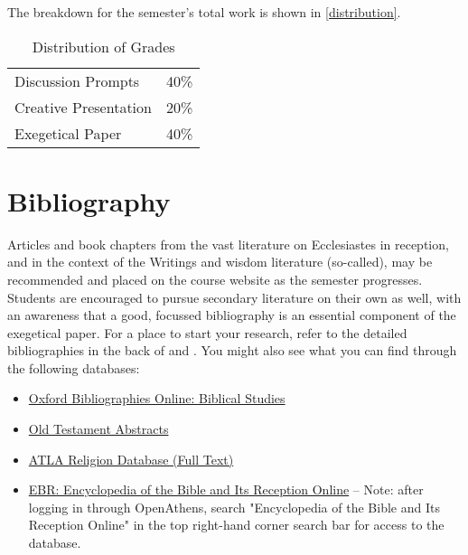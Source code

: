 \documentclass[titlepage]{article}
\newcommand\policy{../policy}
\begin{document}
The breakdown for the semester's total work is shown in
\autoref{distribution}.

\begin{table}[htbp]
  \centering
  {\lining
  \begin{tabular}{lr}
    \toprule
    Discussion Prompts    & 40\% \\
    Creative Presentation & 20\% \\
    Exegetical Paper      & 40\% \\
    \bottomrule
  \end{tabular}}
  \caption{Distribution of Grades}
  \label{distribution}
\end{table}





\section{Bibliography}
\label{bib}

Articles and book chapters from the vast literature on Ecclesiastes in
reception, and in the context of the Writings and wisdom literature
(so-called), may be recommended and placed on the course website as the
semester progresses. Students are encouraged to pursue secondary
literature on their own as well, with an awareness that a good, focussed
bibliography is an essential component of the exegetical paper. For a
place to start your research, refer to the detailed bibliographies in
the back of \cite{Christianson} and \cite{Dell}. You might also see what
you can find through the following databases:

\begin{itemize}
\item \href{http://ezproxy.astheology.ns.ca:2048/login?url=http://www.oxfordbibliographies.com/browse?module_0=obo-9780195393361}{Oxford Bibliographies Online: Biblical Studies}
\item \href{https://search.ebscohost.com/login.aspx?authtype=ip,shib&custid=s5315951&groupid=main&profile=ehost&defaultdb=ota}{Old Testament Abstracts}
\item \href{https://search.ebscohost.com/login.aspx?authtype=ip,shib&custid=s5315951&groupid=main&profile=ehost&defaultdb=rfh}{ATLA Religion Database (Full Text)}
\item \href{https://login.proxy1.athensams.net/login?qurl=https%3A%2F%2Fwww.degruyter.com%2F}{EBR: Encyclopedia of the Bible and Its Reception Online} --
Note: after logging in through OpenAthens, search  "Encyclopedia of the
Bible and Its Reception Online" in the top right-hand corner search bar
for access to the database.
\end{itemize}
\end{document}
